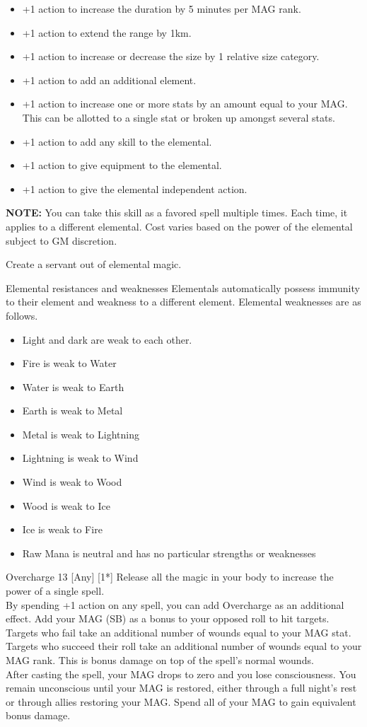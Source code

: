 \begin{pathele}
{\begin{itemize}
\item +1 action to increase the duration by 5 minutes per MAG rank.
\item +1 action to extend the range by 1km.
\item +1 action to increase or decrease the size by 1 relative size category.
\item +1 action to add an additional element.
\item +1 action to increase one or more stats by an amount equal to your MAG. This can be allotted to a single stat or broken up amongst several stats.
\item +1 action to add any skill to the elemental.
\item +1 action to give equipment to the elemental.
\item +1 action to give the elemental independent action.
\end{itemize}
\textbf{NOTE:} You can take this skill as a favored spell multiple times. Each time, it applies to a different elemental. Cost varies based on the power of the elemental subject to GM discretion.}
{Create a servant out of elemental magic.}
\begin{paperbox}{Elemental resistances and weaknesses}
Elementals automatically possess immunity to their element and weakness to a different element. Elemental weaknesses are as follows.
\begin{itemize}
\item Light and dark are weak to each other.
\item Fire is weak to Water
\item Water is weak to Earth
\item Earth is weak to Metal
\item Metal is weak to Lightning
\item Lightning is weak to Wind
\item Wind is weak to Wood
\item Wood is weak to Ice
\item Ice is weak to Fire
\item Raw Mana is neutral and has no particular strengths or weaknesses
\end{itemize}
\end{paperbox}

\spelldescription
{Overcharge}
{13}
[Any]
[1*]
{Release all the magic in your body to increase the power of a single spell.\\By spending +1 action on any spell, you can add Overcharge as an additional effect. Add your MAG (SB) as a bonus to your opposed roll to hit targets. Targets who fail take an additional number of wounds equal to your MAG stat. Targets who succeed their roll take an additional number of wounds equal to your MAG rank. This is bonus damage on top of the spell's normal wounds.\\After casting the spell, your MAG drops to zero and you lose consciousness. You remain unconscious until your MAG is restored, either through a full night's rest or through allies restoring your MAG.}
{Spend all of your MAG to gain equivalent bonus damage.}

\end{pathele}
